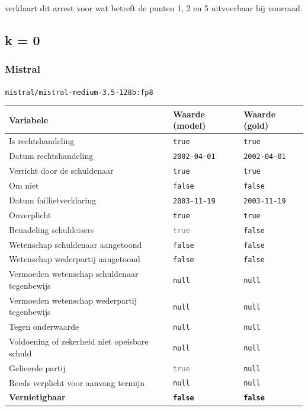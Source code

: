 \documentclass[
  dutch,
  a4paper,
]{article}
\begin{document}
verklaart dit arrest voor wat betreft de punten 1, 2 en 5 uitvoerbaar bij voorraad.

\newpage


\subsection{k = 0}\label{k-0-6}

\subsubsection{Mistral}\label{mistral-18}

\texttt{mistral/mistral-medium-3.5-128b:fp8}

\begin{center}
\small
\begin{tabular}{@{}p{7.4cm}p{2.6cm}p{2.6cm}@{}}
\toprule
Variabele & Waarde (model) & Waarde (gold) \\
\midrule
Is rechtshandeling & \texttt{true} & \texttt{true} \\
Datum rechtshandeling & \texttt{2002-04-01} & \texttt{2002-04-01} \\
Verricht door de schuldenaar & \texttt{true} & \texttt{true} \\
Om niet & \texttt{false} & \texttt{false} \\
Datum faillietverklaring & \texttt{2003-11-19} & \texttt{2003-11-19} \\
Onverplicht & \texttt{true} & \texttt{true} \\
Benadeling schuldeisers & \textcolor{gray}{\texttt{true}} & \texttt{false} \\
Wetenschap schuldenaar aangetoond & \texttt{false} & \texttt{false} \\
Wetenschap wederpartij aangetoond & \texttt{false} & \texttt{false} \\
Vermoeden wetenschap schuldenaar tegenbewijs & \texttt{null} & \texttt{null} \\
Vermoeden wetenschap wederpartij tegenbewijs & \texttt{null} & \texttt{null} \\
Tegen onderwaarde & \texttt{null} & \texttt{null} \\
Voldoening of zekerheid niet opeisbare schuld & \texttt{null} & \texttt{null} \\
Gelieerde partij & \textcolor{gray}{\texttt{true}} & \texttt{null} \\
Reeds verplicht voor aanvang termijn & \texttt{null} & \texttt{null} \\
\textbf{Vernietigbaar} & \textbf{\texttt{false}} & \textbf{\texttt{false}} \\
\bottomrule
\end{tabular}
\end{center}
\end{document}
